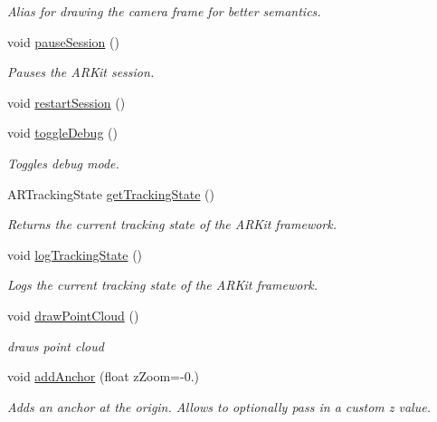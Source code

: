 \begin{DoxyCompactItemize}
\begin{DoxyCompactList}\small\item\em Alias for drawing the camera frame for better semantics. \end{DoxyCompactList}\item 
void \hyperlink{class_a_r_processor_a035d352220785ee03e1bb15ba6bf688d}{pause\+Session} ()
\begin{DoxyCompactList}\small\item\em Pauses the A\+R\+Kit session. \end{DoxyCompactList}\item 
void \hyperlink{class_a_r_processor_a121cd3925743680196771ce07058d52e}{restart\+Session} ()
\item 
void \hyperlink{class_a_r_processor_a832585774cbeb04cc181f01c193940b5}{toggle\+Debug} ()
\begin{DoxyCompactList}\small\item\em Toggles debug mode. \end{DoxyCompactList}\item 
A\+R\+Tracking\+State \hyperlink{class_a_r_processor_aa53d195b42b23d9208071692fd5ac28d}{get\+Tracking\+State} ()
\begin{DoxyCompactList}\small\item\em Returns the current tracking state of the A\+R\+Kit framework. \end{DoxyCompactList}\item 
void \hyperlink{class_a_r_processor_a3ae7b56c7d5f555ec84dbd1f1f0a8f65}{log\+Tracking\+State} ()
\begin{DoxyCompactList}\small\item\em Logs the current tracking state of the A\+R\+Kit framework. \end{DoxyCompactList}\item 
void \hyperlink{class_a_r_processor_ae938bf188d56d8b30b141b2fa23e96f8}{draw\+Point\+Cloud} ()
\begin{DoxyCompactList}\small\item\em draws point cloud \end{DoxyCompactList}\item 
void \hyperlink{class_a_r_processor_a535a8b2d9f2d89ab187962fc8f9ba55d}{add\+Anchor} (float z\+Zoom=-\/0.)
\begin{DoxyCompactList}\small\item\em Adds an anchor at the origin. Allows to optionally pass in a custom z value. \end{DoxyCompactList}\item 

\end{DoxyCompactItemize}
